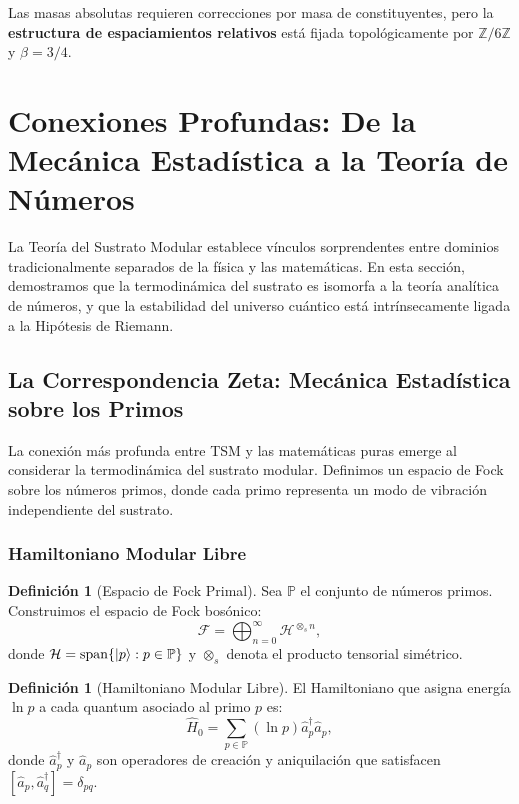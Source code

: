 \documentclass[11pt, a4paper]{article}
\theoremstyle{plain}
\theoremstyle{definition}
\newtheorem{definicion}[teorema]{Definición}
\newcommand{\Zmod}{\mathbb{Z}/6\mathbb{Z}}
\begin{document}
Las masas absolutas requieren correcciones por masa de constituyentes, pero la \textbf{estructura de espaciamientos relativos} está fijada topológicamente por $\Zmod$ y $\beta = 3/4$.


\section{Conexiones Profundas: De la Mecánica Estadística a la Teoría de Números}
\label{sec:conexiones}

La Teoría del Sustrato Modular establece vínculos sorprendentes entre dominios tradicionalmente separados de la física y las matemáticas. En esta sección, demostramos que la termodinámica del sustrato es isomorfa a la teoría analítica de números, y que la estabilidad del universo cuántico está intrínsecamente ligada a la Hipótesis de Riemann.

\subsection{La Correspondencia Zeta: Mecánica Estadística sobre los Primos}

La conexión más profunda entre TSM y las matemáticas puras emerge al considerar la termodinámica del sustrato modular. Definimos un espacio de Fock sobre los números primos, donde cada primo representa un modo de vibración independiente del sustrato.

\subsubsection{Hamiltoniano Modular Libre}

\begin{definicion}[Espacio de Fock Primal]
Sea $\mathbb{P}$ el conjunto de números primos. Construimos el espacio de Fock bosónico:
\begin{equation}
\mathcal{F} = \bigoplus_{n=0}^\infty \mathcal{H}^{\otimes_s n},
\end{equation}
donde $\mathcal{H} = \text{span}\{\ket{p} : p \in \mathbb{P}\}$ y $\otimes_s$ denota el producto tensorial simétrico.
\end{definicion}

\begin{definicion}[Hamiltoniano Modular Libre]
El Hamiltoniano que asigna energía $\ln p$ a cada quantum asociado al primo $p$ es:
\begin{equation}
\hat{H}_0 = \sum_{p \in \mathbb{P}} (\ln p) \hat{a}_p^\dagger \hat{a}_p,
\label{eq:hamiltonian_modular}
\end{equation}
donde $\hat{a}_p^\dagger$ y $\hat{a}_p$ son operadores de creación y aniquilación que satisfacen $[\hat{a}_p, \hat{a}_q^\dagger] = \delta_{pq}$.
\end{definicion}
\end{document}
